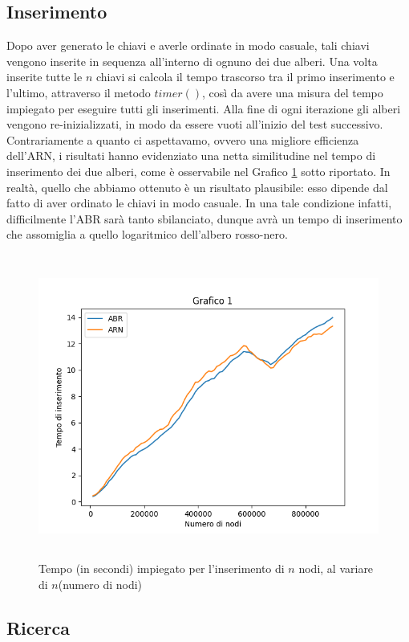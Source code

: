 \documentclass{article}
\begin{document}
\subsection{Inserimento}

Dopo aver generato le chiavi e averle ordinate in modo casuale, tali chiavi vengono inserite in sequenza all'interno di ognuno dei due alberi. Una volta inserite tutte le $n$ chiavi si calcola il tempo trascorso tra il primo inserimento e l'ultimo, attraverso il metodo $timer()$, così da avere una misura del tempo impiegato per eseguire tutti gli inserimenti.
Alla fine di ogni iterazione gli alberi vengono re-inizializzati, in modo da essere vuoti all'inizio del test successivo.\\
Contrariamente a quanto ci aspettavamo, ovvero una migliore efficienza dell'ARN, i risultati hanno evidenziato una netta similitudine nel tempo di inserimento dei due alberi, come è osservabile nel Grafico \ref{fig:mesh1} sotto riportato.
In realtà, quello che abbiamo ottenuto è un risultato plausibile: esso dipende dal fatto di aver ordinato le chiavi in modo casuale. In una tale condizione infatti, difficilmente l'ABR sarà tanto sbilanciato, dunque avrà un tempo di inserimento che assomiglia a quello logaritmico dell'albero rosso-nero.

\begin{figure}[h]
\includegraphics[height=10cm]{Figure_1.png}
\centering
\caption{Tempo (in secondi) impiegato per l'inserimento di $n$ nodi, al variare di $n$(numero di nodi)}
\label{fig:mesh1}
\end{figure}

\subsection{Ricerca}
\end{document}

